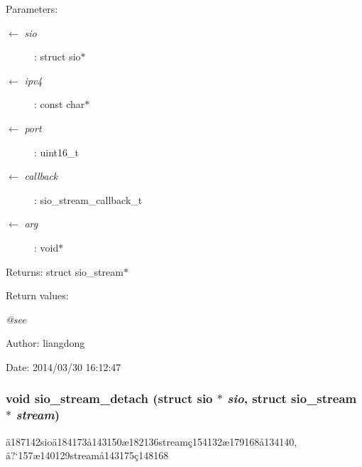 \begin{Desc}
\item[Parameters:]
\begin{description}
\item[\mbox{$\leftarrow$} {\em sio}]: struct sio$\ast$ \item[\mbox{$\leftarrow$} {\em ipv4}]: const char$\ast$ \item[\mbox{$\leftarrow$} {\em port}]: uint16\_\-t \item[\mbox{$\leftarrow$} {\em callback}]: sio\_\-stream\_\-callback\_\-t \item[\mbox{$\leftarrow$} {\em arg}]: void$\ast$ \end{description}
\end{Desc}
\begin{Desc}
\item[Returns:]struct sio\_\-stream$\ast$ \end{Desc}
\begin{Desc}
\item[Return values:]
\begin{description}
\item[{\em @see}]\end{description}
\end{Desc}
\begin{Desc}
\item[Author:]liangdong \end{Desc}
\begin{Desc}
\item[Date:]2014/03/30 16:12:47 \end{Desc}
\subsubsection{\setlength{\rightskip}{0pt plus 5cm}void sio\_\-stream\_\-detach (struct sio $\ast$ {\em sio}, struct sio\_\-stream $\ast$ {\em stream})}\label{sio__stream_8h_a12}


\"{a}187142sio\"{a}184173\aa{}143150\ae{}182136stream\c{c}154132\ae{}179168\aa{}134140, \"{a}?`157\ae{}140129stream\aa{}143175\c{c}148168 

